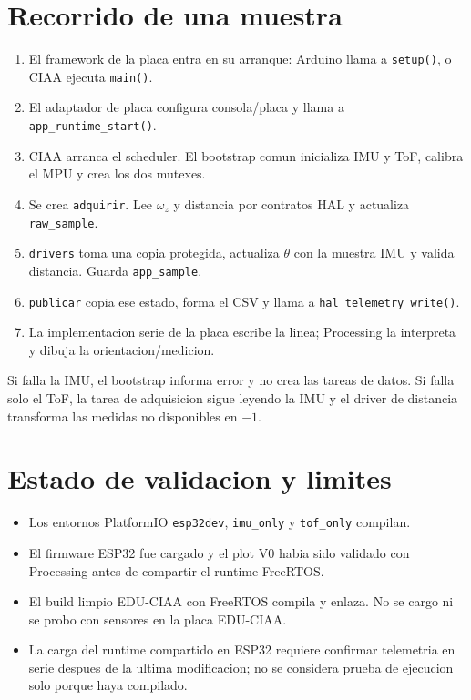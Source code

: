 \documentclass[11pt,a4paper]{article}
\begin{document}
\section{Recorrido de una muestra}

\begin{enumerate}
  \item El framework de la placa entra en su arranque: Arduino llama a
        \texttt{setup()}, o CIAA ejecuta \texttt{main()}.
  \item El adaptador de placa configura consola/placa y llama a
        \texttt{app\_runtime\_start()}.
  \item CIAA arranca el scheduler. El bootstrap comun inicializa IMU y ToF,
        calibra el MPU y crea los dos mutexes.
  \item Se crea \texttt{adquirir}. Lee $\omega_z$ y distancia por contratos HAL
        y actualiza \texttt{raw\_sample}.
  \item \texttt{drivers} toma una copia protegida, actualiza $\theta$ con la
        muestra IMU y valida distancia. Guarda \texttt{app\_sample}.
  \item \texttt{publicar} copia ese estado, forma el CSV y llama a
        \texttt{hal\_telemetry\_write()}.
  \item La implementacion serie de la placa escribe la linea; Processing la
        interpreta y dibuja la orientacion/medicion.
\end{enumerate}

Si falla la IMU, el bootstrap informa error y no crea las tareas de datos. Si
falla solo el ToF, la tarea de adquisicion sigue leyendo la IMU y el driver de
distancia transforma las medidas no disponibles en $-1$.

\section{Estado de validacion y limites}

\begin{itemize}
  \item Los entornos PlatformIO \texttt{esp32dev}, \texttt{imu\_only} y
        \texttt{tof\_only} compilan.
  \item El firmware ESP32 fue cargado y el plot V0 habia sido validado con
        Processing antes de compartir el runtime FreeRTOS.
  \item El build limpio EDU-CIAA con FreeRTOS compila y enlaza. No se cargo ni
        se probo con sensores en la placa EDU-CIAA.
  \item La carga del runtime compartido en ESP32 requiere confirmar telemetria
        en serie despues de la ultima modificacion; no se considera prueba de
        ejecucion solo porque haya compilado.
\end{itemize}
\end{document}
